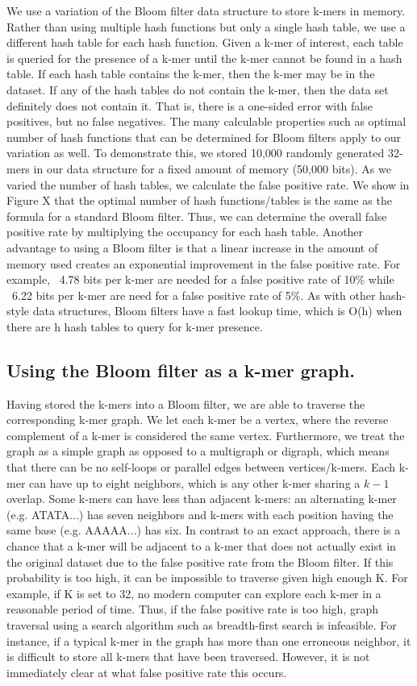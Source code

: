 \documentclass[12pt]{article} \usepackage{simplemargins}
\begin{document}
We use a variation of the Bloom filter data structure to store k-mers
in memory. Rather than using multiple hash functions but only a single
hash table, we use a different hash table for each hash
function. Given a k-mer of interest, each table is queried for the
presence of a k-mer until the k-mer cannot be found in a hash
table. If each hash table contains the k-mer, then the k-mer may
be in the dataset. If any of the hash tables do not contain the
k-mer, then the data set definitely does not contain it. That is, there is a one-sided
error with false positives, but no false negatives. The many
calculable properties such as optimal number of hash functions that
can be determined for Bloom filters apply to our variation as well. To
demonstrate this, we stored 10,000 randomly generated 32-mers in our
data structure for a fixed amount of memory (50,000 bits). As we
varied the number of hash tables, we calculate the false positive
rate. We show in Figure X that the optimal number of hash
functions/tables is the same as the formula for a standard Bloom
filter. Thus, we can determine the overall false positive rate by
multiplying the occupancy for each hash table. Another advantage to
using a Bloom filter is that a linear increase in the amount of memory
used creates an exponential improvement in the false positive
rate. For example, ~4.78 bits per k-mer are needed for a false
positive rate of 10\% while ~6.22 bits per k-mer are need for a false
positive rate of
5\%. As with other hash-style data structures, Bloom filters have a
fast lookup time, which is O(h) when there are h hash tables to query
for k-mer presence.

\subsection{Using the Bloom filter as a k-mer graph.}
Having stored the k-mers into a Bloom filter, we are able to traverse
the corresponding k-mer graph. We let each k-mer be a vertex, where
the reverse complement of a k-mer is considered the same
vertex. Furthermore, we treat the graph as a simple graph as opposed
to a multigraph or digraph, which means that there can be no
self-loops or parallel edges between vertices/k-mers. Each k-mer can
have up to eight neighbors, which is any other k-mer sharing a $k-1$ 
overlap. Some k-mers can have less than adjacent k-mers: an alternating k-mer
(e.g. ATATA...) has seven neighbors and k-mers with each position
having the same base (e.g. AAAAA...) has six. In contrast to an exact
approach, there is a chance that a k-mer will be adjacent to a k-mer
that does not actually exist in the original dataset due to the false
positive rate from the Bloom filter. If this probability is too high,
it can be impossible to traverse given high enough K. For example, if
K is set to 32, no modern computer can explore each k-mer in a
reasonable period of time. Thus, if the false positive rate is too
high, graph traversal using a search algorithm such as breadth-first
search is infeasible. For instance, if a typical k-mer in the graph has 
more than one erroneous neighbor, it is difficult to store all k-mers 
that have been traversed. However, it is not immediately clear 
at what false positive rate this occurs.
\end{document}
